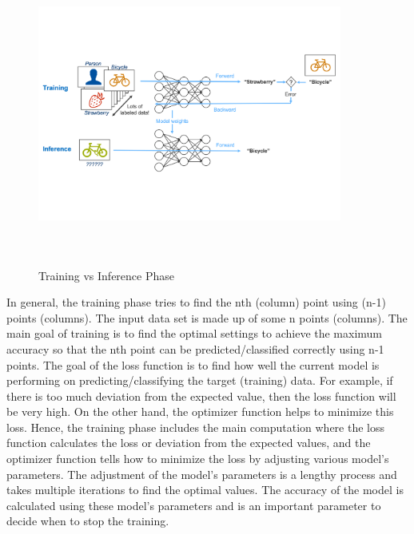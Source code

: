 \begin{figure}
    \centering
    \includegraphics[width=10cm, height=10cm]{images/Background/config.pdf}
    \vspace{-6em}
    \caption{Training vs Inference Phase \cite{82}}
    \label{fig:backgroundTI}
\end{figure}

In general, the training phase tries to find the nth (column) point using (n-1) points (columns). The input data set is made up of some n points (columns). The main goal of training is to find the optimal settings to achieve the maximum accuracy so that the nth point can be predicted/classified correctly using n-1 points. The goal of the loss function is to find how well the current model is performing on predicting/classifying the target (training) data. For example, if there is too much deviation from the expected value, then the loss function will be very high. On the other hand, the optimizer function helps to minimize this loss. Hence, the training phase includes the main computation where the loss function calculates the loss or deviation from the expected values, and the optimizer function tells how to minimize the loss by adjusting various model's parameters. The adjustment of the model's parameters is a lengthy process and takes multiple iterations to find the optimal values. The accuracy of the model is calculated using these model's parameters and is an important parameter to decide when to stop the training.

